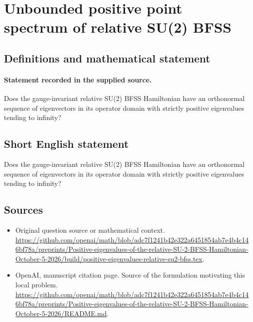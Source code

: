\documentclass[11pt]{article}
\begin{document}
\section*{Unbounded positive point spectrum of relative SU(2) BFSS}\label{30007209}
\subsection{Definitions and mathematical statement}
\paragraph{Statement recorded in the supplied source.}
Does the gauge-invariant relative SU(2) BFSS Hamiltonian have an orthonormal sequence of eigenvectors in its operator domain with strictly positive eigenvalues tending to infinity?
\subsection{Short English statement}
Does the gauge-invariant relative SU(2) BFSS Hamiltonian have an orthonormal sequence of eigenvectors in its operator domain with strictly positive eigenvalues tending to infinity?
\subsection{Sources}
\begin{itemize}
\item[S1] Original question source or mathematical context.
\url{https://github.com/openai/math/blob/adc7f1241b42e322a6451854ab7e4b4c146bf78a/preprints/Positive-eigenvalues-of-the-relative-SU-2-BFSS-Hamiltonian-October-5-2026/build/positive-eigenvalues-relative-su2-bfss.tex}.
\item[S2] OpenAI, manuscript citation page. Source of the formulation motivating this local problem.
\url{https://github.com/openai/math/blob/adc7f1241b42e322a6451854ab7e4b4c146bf78a/preprints/Positive-eigenvalues-of-the-relative-SU-2-BFSS-Hamiltonian-October-5-2026/README.md}.
\end{itemize}
\end{document}
